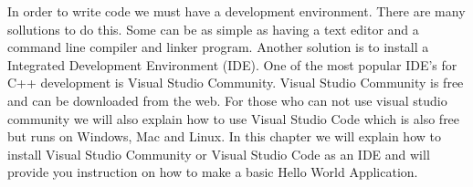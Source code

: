 

In order to write code we must have a development environment. There are many sollutions to do this. Some can be as simple as having a text editor and a command line compiler and linker program. Another solution is to install a Integrated Development Environment (IDE). One of the most popular IDE's for C++ development is Visual Studio Community. Visual Studio Community is free and can be downloaded from the web. For those who can not use visual studio community we will also explain how to use Visual Studio Code which is also free but runs on Windows, Mac and Linux. In this chapter we will explain how to install Visual Studio Community or Visual Studio Code as an IDE and will provide you instruction on how to make a basic Hello World Application.



	